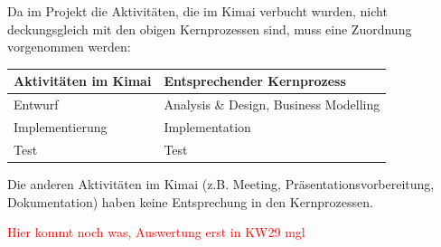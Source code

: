 \documentclass[../review_3.tex]{subfiles}
\begin{document}
Da im Projekt die Aktivitäten, die im Kimai verbucht wurden, nicht deckungsgleich mit den obigen Kernprozessen sind, muss eine Zuordnung vorgenommen werden:

\begin{center}
    \begin{longtable} [h] {l l}
        \toprule
        \textbf{Aktivitäten im Kimai} & \textbf{Entsprechender Kernprozess}    \\ \midrule
        Entwurf                       & Analysis \& Design, Business Modelling \\
        Implementierung               & Implementation                         \\
        Test                          & Test                                   \\ \bottomrule
    \end{longtable}
\end{center}

Die anderen Aktivitäten im Kimai (z.B. Meeting, Präsentationsvorbereitung, Dokumentation) haben keine Entsprechung in den Kernprozessen.

\textcolor{red}{Hier kommt noch was, Auswertung erst in KW29 mgl}
\end{document}
